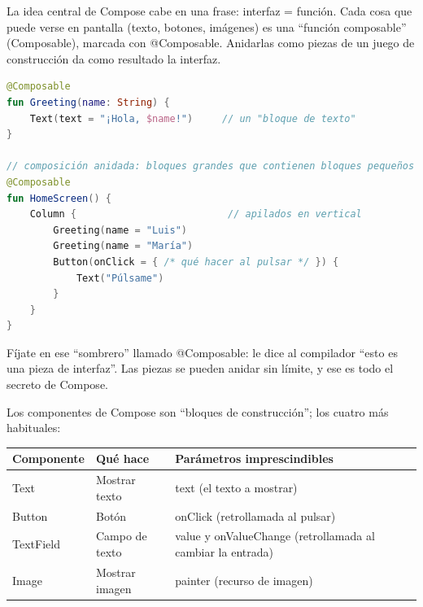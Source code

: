 


La idea central de Compose cabe en una frase: interfaz = función. Cada cosa que puede verse en pantalla (texto, botones, imágenes) es una “función composable” (Composable), marcada con @Composable. Anidarlas como piezas de un juego de construcción da como resultado la interfaz.

\begin{lstlisting}[language=Kotlin]
@Composable
fun Greeting(name: String) {
    Text(text = "¡Hola, $name!")     // un "bloque de texto"
}

// composición anidada: bloques grandes que contienen bloques pequeños
@Composable
fun HomeScreen() {
    Column {                          // apilados en vertical
        Greeting(name = "Luis")
        Greeting(name = "María")
        Button(onClick = { /* qué hacer al pulsar */ }) {
            Text("Púlsame")
        }
    }
}
\end{lstlisting}

Fíjate en ese “sombrero” llamado @Composable: le dice al compilador “esto es una pieza de interfaz”. Las piezas se pueden anidar sin límite, y ese es todo el secreto de Compose.


Los componentes de Compose son “bloques de construcción”; los cuatro más habituales:

\begin{center}
\begin{tabularx}{\linewidth}{|X|X|X|}
\hline
\textbf{Componente} & \textbf{Qué hace} & \textbf{Parámetros imprescindibles} \tabularnewline
\hline
Text & Mostrar texto & text (el texto a mostrar) \tabularnewline
Button & Botón & onClick (retrollamada al pulsar) \tabularnewline
TextField & Campo de texto & value y onValueChange (retrollamada al cambiar la entrada) \tabularnewline
Image & Mostrar imagen & painter (recurso de imagen) \tabularnewline
\hline
\end{tabularx}
\end{center}

